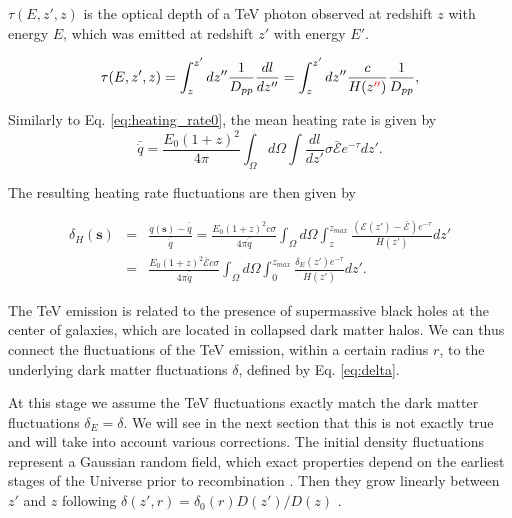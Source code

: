 \documentclass[twocolumns]{emulateapj}
\newcommand\ALc[1]{{\color{red} \bf #1}} %
\begin{document}
$\tau(E,z',z)$ is the optical depth of a TeV photon observed at redshift $z$ with energy $E$, which was emitted at redshift $z'$ with energy $E'$.

\begin{equation}
  \label{eq:tau}
  \tau(E,z',z)=\int_z^{z'}dz''\frac{1}{D_{pp}}\frac{dl}{dz''}=\int_z^{z'}dz''\frac{c}{H(z\ALc{''})}\frac{1}{D_{pp}},
\end{equation}



Similarly to Eq. \ref{eq:heating_rate0},  the mean heating rate is given by 
\begin{equation}
  \label{eq:mean_exp_heat}
  \bar{\dot{q}}=\frac{E_0(1+z)^2}{4\pi}\int_{\Omega}d\Omega\int \frac{dl}{dz'}\sigma\bar{\mathcal{E}} e^{-\tau}dz'.
\end{equation}

The resulting heating rate fluctuations are then given by

\begin{eqnarray}
  \label{eq:fluc_exp0}
  \delta_H(\mathbf{s})&=&\frac{\dot{q}(\mathbf{s})-\bar{\dot{q}}}{\bar{\dot{q}}}=\frac{E_0(1+z)^2c\sigma}{4\pi\bar{\dot{q}}} \int_{\Omega}d\Omega\int_z^{z_{max}} \frac{ ( \mathcal{E}(z')-\bar{\mathcal{E}})  e^{-\tau}}{H(z')} dz' \\ \nonumber
  &=&\frac{E_0(1+z)^2\bar{\mathcal{E}} c\sigma}{4\pi\bar{\dot{q}}}  \int_{\Omega}d\Omega\int_0^{z_{max}}   \frac{\delta_E(z')  e^{-\tau}}{H(z')}dz'.
\end{eqnarray}

The TeV emission is related to the presence of supermassive black holes at the center of galaxies, which are located in collapsed dark matter halos.  We can thus connect the fluctuations of the TeV emission, within a certain radius $r$, to the underlying dark matter fluctuations $\delta$, defined by Eq. \ref{eq:delta}.


At this stage we assume the TeV fluctuations exactly match the dark matter fluctuations $\delta_E=\delta$.  We will see in the next section that this is not exactly true and will take into account various corrections.  The initial density fluctuations represent a Gaussian random field, which exact properties depend on the earliest stages of the Universe prior to recombination \citep{1986ApJ...304...15B,Peebles}. Then they grow linearly between $z'$ and $z$ following $\delta(z',r)=\delta_0(r)D(z')/D(z)$ \citep{ 1977MNRAS.179..351H}.
\end{document}
